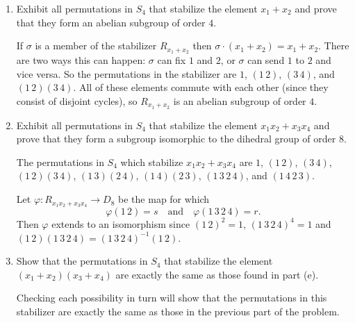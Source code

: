 \begin{enumerate}
\item Exhibit all permutations in $S_4$ that stabilize the element
  $x_1 + x_2$ and prove that they form an abelian subgroup of order
  $4$.
  \begin{solution}
    If $\sigma$ is a member of the stabilizer $R_{x_1+x_2}$ then
    $\sigma\cdot(x_1 + x_2) = x_1 + x_2$. There are two ways this can
    happen: $\sigma$ can fix $1$ and $2$, or $\sigma$ can send $1$ to
    $2$ and vice versa. So the permutations in the stabilizer are $1$,
    $(1\,2)$, $(3\,4)$, and $(1\,2)(3\,4)$. All of these elements
    commute with each other (since they consist of disjoint cycles),
    so $R_{x_1+x_2}$ is an abelian subgroup of order $4$.
  \end{solution}
\item Exhibit all permutations in $S_4$ that stabilize the element
  $x_1x_2 + x_3x_4$ and prove that they form a subgroup isomorphic to
  the dihedral group of order $8$.
  \begin{solution}
    The permutations in $S_4$ which stabilize $x_1x_2 + x_3x_4$ are
    $1$, $(1\,2)$, $(3\,4)$, $(1\,2)(3\,4)$, $(1\,3)(2\,4)$,
    $(1\,4)(2\,3)$, $(1\,3\,2\,4)$, and $(1\,4\,2\,3)$.

    Let $\varphi\colon R_{x_1x_2+x_3x_4}\to D_8$ be the map for which
    \begin{equation*}
      \varphi(1\,2) = s
      \quad\text{and}\quad
      \varphi(1\,3\,2\,4) = r.
    \end{equation*}
    Then $\varphi$ extends to an isomorphism since $(1\,2)^2 = 1$,
    $(1\,3\,2\,4)^4 = 1$ and
    $(1\,2)(1\,3\,2\,4) = (1\,3\,2\,4)^{-1}(1\,2)$.
  \end{solution}
\item Show that the permutations in $S_4$ that stabilize the element
  $(x_1 + x_2)(x_3 + x_4)$ are exactly the same as those found in part
  (e).
  \begin{solution}
    Checking each possibility in turn will show that the permutations
    in this stabilizer are exactly the same as those in the previous
    part of the problem.
  \end{solution}
\end{enumerate}

